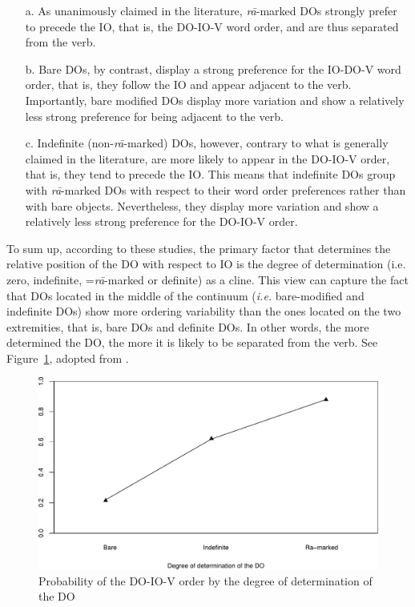 \documentclass[output=paper]{langsci/langscibook}
\begin{document}
\begin{itemize}
	
	\item[a.] As unanimously claimed in the literature, \textit{r\=a}-marked DOs strongly prefer to precede the IO, that is, the DO-IO-V word order, and are thus separated from the verb.
	
	\item[b.] Bare DOs, by contrast, display a strong preference for the IO-DO-V word order, that is, they follow the IO and appear adjacent to the verb. Importantly, bare modified DOs display more variation and show a relatively less strong preference for being adjacent to the verb.
	
	\item[c.] Indefinite (non-\textit{r\=a}-marked) DOs, however, contrary to what is generally claimed in the literature, are more likely to appear in the DO-IO-V order, that is, they tend to precede the IO. This means that indefinite DOs group with \textit{r\=a}-marked DOs with respect to their word order preferences rather than with bare objects. Nevertheless, they display more variation and show a relatively less strong preference for the DO-IO-V order.
	
\end{itemize}


To sum up, according to these studies, the primary factor that determines the relative position of the DO with respect to IO is the degree of determination (i.e. zero, indefinite, =\textit{r\=a}-marked or definite) as a cline.  This view can capture the fact that DOs located in the middle of the continuum (\textit{i.e.} bare-modified and indefinite DOs) show more ordering variability than the ones located on the two extremities, that is, bare DOs and definite DOs. In other words, the more determined the DO, the more it is likely to be separated from the verb. See Figure~\ref{Cline}, adopted from \citet[196]{FaghiriPhd}.


\begin{figure}
	\includegraphics[width=\textwidth]{plots/Rplot01bis.pdf}
	\caption{Probability of the DO-IO-V order by the degree of determination of the DO}\label{Cline}
\end{figure}
\end{document}

